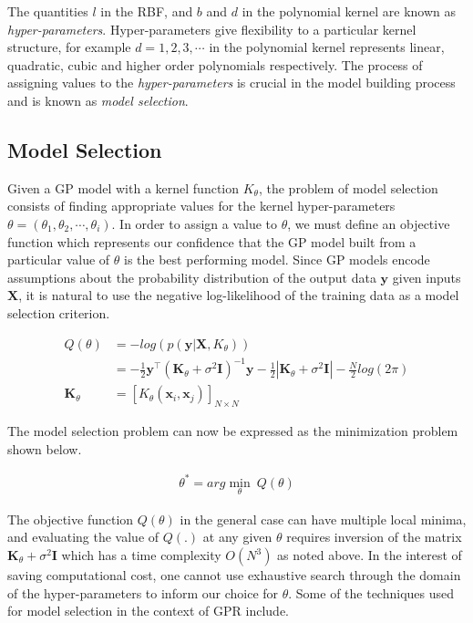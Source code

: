 \documentclass[sw, draft]{AGUTeX}
\begin{document}
\begin{article}
The quantities $l$ in the RBF, and $b$ and $d$ in the polynomial kernel are known as \emph{hyper-parameters}. Hyper-parameters give flexibility to a particular kernel structure, for example $d = 1, 2, 3, \cdots$ in the polynomial kernel represents linear, quadratic, cubic and higher order polynomials respectively. The process of assigning values to the \emph{hyper-parameters} is crucial in the model building process and is known as \emph{model selection}. 

\subsection{Model Selection}

Given a GP model with a kernel function $K_\theta$, the problem of model selection consists of finding appropriate values for the kernel hyper-parameters $\theta = \left(\theta_1, \theta_2, \cdots, \theta_i\right)$. In order to assign a value to $\theta$, we must define an objective function which represents our confidence that the GP model built from a particular value of $\theta$ is the best performing model. Since GP models encode assumptions about the probability distribution of the output data $\mathbf{y}$ given inputs $\mathbf{X}$, it is natural to use the negative log-likelihood of the training data as a model selection criterion. 

\begin{align*}
  Q(\theta) & = - log(p(\mathbf{y}|\mathbf{X}, K_\theta)) \\
            & = -\frac{1}{2} \mathbf{y}^\intercal (\mathbf{K}_\theta + \sigma^{2} \mathbf{I})^{-1} \mathbf{y} - \frac{1}{2}|\mathbf{K}_\theta + \sigma^{2} \mathbf{I}| - \frac{N}{2}log(2\pi) \\
  \mathbf{K}_\theta & = [K_{\theta}(\mathbf{x}_i, \mathbf{x}_j)]_{N \times N}
\end{align*}

The model selection problem can now be expressed as the minimization problem shown below.

\begin{align*}
\theta^* = arg\min_{\theta} \ Q(\theta)
\end{align*}

The objective function $Q(\theta)$ in the general case can have multiple local minima, and evaluating the value of $Q(.)$ at any given $\theta$ requires inversion of the matrix $\mathbf{K}_\theta + \sigma^{2} \mathbf{I}$ which has a time complexity $O(N^3)$ as noted above. In the interest of saving computational cost, one cannot use exhaustive search through the domain of the hyper-parameters to inform our choice for $\theta$. Some of the techniques used for model selection in the context of GPR include.


\end{article}
\end{document}
